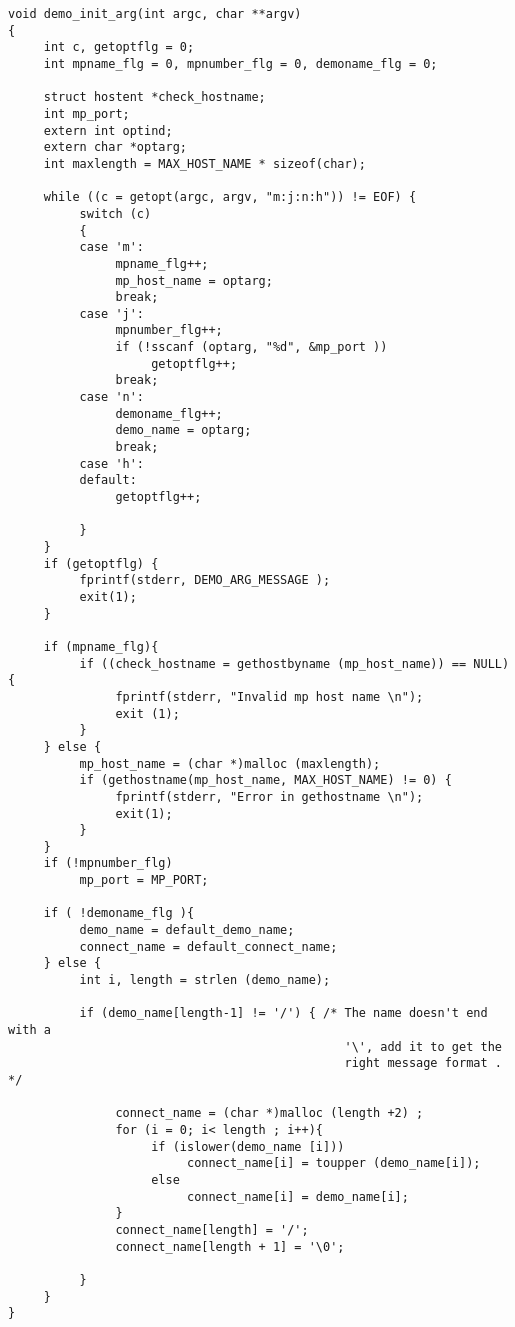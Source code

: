 \begin{verbatim}
void demo_init_arg(int argc, char **argv)
{
     int c, getoptflg = 0;
     int mpname_flg = 0, mpnumber_flg = 0, demoname_flg = 0;

     struct hostent *check_hostname;
     int mp_port;
     extern int optind;
     extern char *optarg;
     int maxlength = MAX_HOST_NAME * sizeof(char);

     while ((c = getopt(argc, argv, "m:j:n:h")) != EOF) {
          switch (c)
          {
          case 'm':
               mpname_flg++;
               mp_host_name = optarg;
               break;
          case 'j':
               mpnumber_flg++;
               if (!sscanf (optarg, "%d", &mp_port ))
                    getoptflg++;
               break;
          case 'n':
               demoname_flg++;
               demo_name = optarg;
               break;
          case 'h':
          default:
               getoptflg++;

          }
     }
     if (getoptflg) {
          fprintf(stderr, DEMO_ARG_MESSAGE );
          exit(1);
     }

     if (mpname_flg){
          if ((check_hostname = gethostbyname (mp_host_name)) == NULL){
               fprintf(stderr, "Invalid mp host name \n");
               exit (1);
          }
     } else {
          mp_host_name = (char *)malloc (maxlength);
          if (gethostname(mp_host_name, MAX_HOST_NAME) != 0) {
               fprintf(stderr, "Error in gethostname \n");
               exit(1);
          }
     }
     if (!mpnumber_flg)
          mp_port = MP_PORT;

     if ( !demoname_flg ){
          demo_name = default_demo_name;
          connect_name = default_connect_name;
     } else {
          int i, length = strlen (demo_name);

          if (demo_name[length-1] != '/') { /* The name doesn't end with a
                                               '\', add it to get the
                                               right message format . */

               connect_name = (char *)malloc (length +2) ;
               for (i = 0; i< length ; i++){
                    if (islower(demo_name [i]))
                         connect_name[i] = toupper (demo_name[i]);
                    else
                         connect_name[i] = demo_name[i];
               }
               connect_name[length] = '/';
               connect_name[length + 1] = '\0';

          }
     }
}


\end{verbatim}

